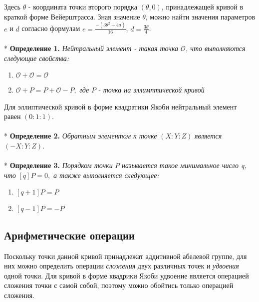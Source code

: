 \documentclass[12pt]{article}
\begin{document}
Здесь $\theta$ - координата точки второго порядка $(\theta, 0)$, принадлежащей кривой в краткой форме Вейерштрасса. Зная значение $\theta$, можно найти значения параметров $e$ и $d$ согласно формулам $e = \frac{-(3\theta^2 + 4a)}{16}$, $d = \frac{3\theta}{4}$.\\
\\*
\textbf{Определение 1.} \textit{Нейтральный элемент - такая точка $\mathcal{O}$, что выполняются следующие свойства:}
\begin{enumerate}
\item $\mathcal{O} + \mathcal{O} = \mathcal{O}$
\item $\mathcal{O} + P = P + \mathcal{O} - P,$ \textit{где} $P$ \textit{- точка на эллимптической кривой}
\end{enumerate}
Для эллиптической кривой в форме квадратики Якоби нейтральный элемент равен $(0 : 1 : 1)$. \\
\\*
\textbf{Определение 2.} \textit{Обратным элементом к точке} $(X : Y : Z)$ \textit{является} $(-X : Y : Z)$. \\
\\*
\textbf{Определение 3.} \textit{Порядком точки} $P$ \textit{называется такое минимальное число q, что} $[q]P = 0,$ \textit{а также выполняется следующее:}
\begin{enumerate}
\item $[q + 1]P = P$
\item $[q - 1]P = - P$
\end{enumerate}

\subsection{Арифметические операции}
Поскольку точки данной кривой принадлежат аддитивной абелевой группе, для них можно определить операции \textit{сложения} двух различных точек и \textit{удвоения} одной точки. Для кривой в форме квадрики Якоби удвоение является операцией сложения точки с самой собой, поэтому можно обойтись только операцией сложения.
\end{document}
